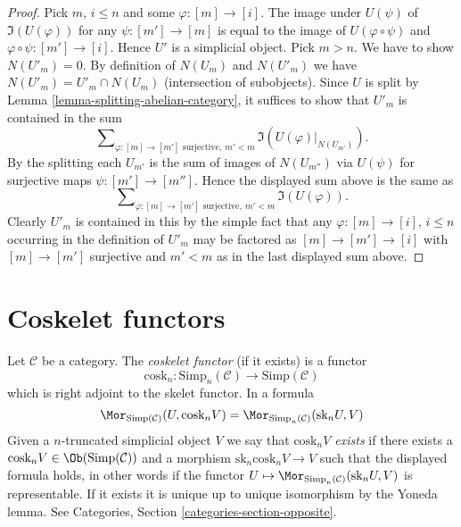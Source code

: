 \begin{proof}
Pick $m$, $i \leq n$ and some $\varphi : [m] \to [i]$.
The image under $U(\psi)$ of $\Im(U(\varphi))$
for any $\psi : [m'] \to [m]$ is
equal to the image of $U(\varphi \circ \psi)$ and
$\varphi \circ \psi : [m'] \to [i]$.
Hence $U'$ is a simplicial object.
Pick $m > n$. We have to show $N(U'_m) = 0$.
By definition of $N(U_m)$ and $N(U'_m)$ we have
$N(U'_m) = U'_m \cap N(U_m)$ (intersection of subobjects).
Since $U$ is split by Lemma \ref{lemma-splitting-abelian-category},
it suffices to show that $U'_m$ is contained in the sum
$$
\sum\nolimits_{\varphi : [m] \to [m']\text{ surjective}, \ m' < m}
\Im(U(\varphi)|_{N(U_{m'})}).
$$
By the splitting each $U_{m'}$ is the sum of images of
$N(U_{m''})$ via $U(\psi)$ for surjective maps
$\psi : [m'] \to [m'']$. Hence the displayed sum above
is the same as
$$
\sum\nolimits_{\varphi : [m] \to [m']\text{ surjective}, \ m' < m}
\Im(U(\varphi)).
$$
Clearly $U'_m$ is contained in this by the simple fact that
any $\varphi : [m] \to [i]$, $i \leq n$ occurring in the definition
of $U'_m$ may be factored as
$[m] \to [m'] \to [i]$ with $[m] \to [m']$ surjective
and $m' < m$ as in the last displayed sum above.
\end{proof}




\section{Coskelet functors}
\label{section-coskelet}

\noindent
Let $\mathcal{C}$ be a category.
The {\it coskelet functor} (if it exists) is a functor
$$
\text{cosk}_n :
\text{Simp}_n(\mathcal{C}) \longrightarrow \text{Simp}(\mathcal{C})
$$
which is right adjoint to the skelet functor. In a formula
\begin{equation}
\label{equation-cosk}
\Mor_{\text{Simp}(\mathcal{C})}(U, \text{cosk}_n V)
=
\Mor_{\text{Simp}_n(\mathcal{C})}(\text{sk}_n U, V)
\end{equation}
Given a $n$-truncated simplicial object $V$ we
say that {\it $\text{cosk}_nV$ exists} if there
exists a $\text{cosk}_nV \in \Ob(\text{Simp}(\mathcal{C}))$
and a morphism $\text{sk}_n \text{cosk}_n V \to V$
such that the displayed formula holds, in other words
if the functor
$U \mapsto \Mor_{\text{Simp}_n(\mathcal{C})}(\text{sk}_n U, V)$
is representable. If it exists it
is unique up to unique isomorphism by the Yoneda lemma.
See Categories, Section \ref{categories-section-opposite}.


